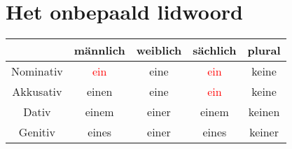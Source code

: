 \documentclass[main.tex]{subfiles}
\begin{document}
\section{Het onbepaald lidwoord}


\begin{tabular}{|c|c|c|c|c|}
\hline 
\rowcolor{gray}
& männlich & weiblich & sächlich & plural \\ 
\hline 
\cellcolor[gray]{0.8}Nominativ & \textcolor{red}{ein} & eine & \textcolor{red}{ein} & keine \\ 
\hline 
\cellcolor[gray]{0.8}Akkusativ & einen & eine & \textcolor{red}{ein} & keine \\ 
\hline 
\cellcolor[gray]{0.8}Dativ & einem & einer & einem & keinen \\ 
\hline 
\cellcolor[gray]{0.8}Genitiv & eines & einer & eines & keiner \\ 
\hline 
\end{tabular} 
\end{document}
